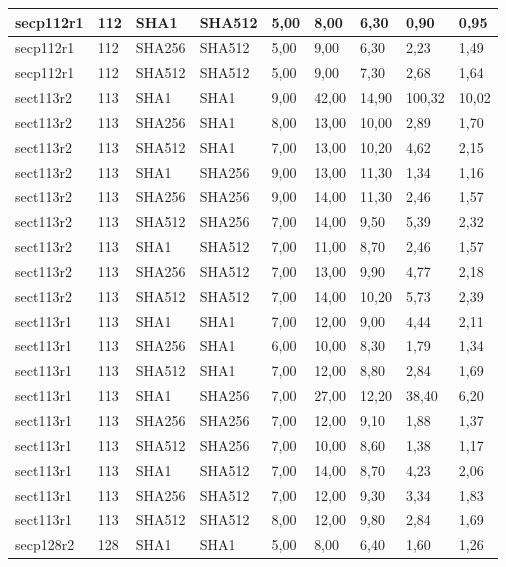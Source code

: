 \begin{longtable}{| l | l | l | l | l |l |l |l |l |}
secp112r1 & 112 & SHA1 & SHA512 & 5,00 & 8,00 & 6,30 & 0,90 & 0,95 \\ \hline 
secp112r1 & 112 & SHA256 & SHA512 & 5,00 & 9,00 & 6,30 & 2,23 & 1,49 \\ \hline 
secp112r1 & 112 & SHA512 & SHA512 & 5,00 & 9,00 & 7,30 & 2,68 & 1,64 \\ \hline 
sect113r2 & 113 & SHA1 & SHA1 & 9,00 & 42,00 & 14,90 & 100,32 & 10,02 \\ \hline 
sect113r2 & 113 & SHA256 & SHA1 & 8,00 & 13,00 & 10,00 & 2,89 & 1,70 \\ \hline 
sect113r2 & 113 & SHA512 & SHA1 & 7,00 & 13,00 & 10,20 & 4,62 & 2,15 \\ \hline 
sect113r2 & 113 & SHA1 & SHA256 & 9,00 & 13,00 & 11,30 & 1,34 & 1,16 \\ \hline 
sect113r2 & 113 & SHA256 & SHA256 & 9,00 & 14,00 & 11,30 & 2,46 & 1,57 \\ \hline 
sect113r2 & 113 & SHA512 & SHA256 & 7,00 & 14,00 & 9,50 & 5,39 & 2,32 \\ \hline 
sect113r2 & 113 & SHA1 & SHA512 & 7,00 & 11,00 & 8,70 & 2,46 & 1,57 \\ \hline 
sect113r2 & 113 & SHA256 & SHA512 & 7,00 & 13,00 & 9,90 & 4,77 & 2,18 \\ \hline 
sect113r2 & 113 & SHA512 & SHA512 & 7,00 & 14,00 & 10,20 & 5,73 & 2,39 \\ \hline 
sect113r1 & 113 & SHA1 & SHA1 & 7,00 & 12,00 & 9,00 & 4,44 & 2,11 \\ \hline 
sect113r1 & 113 & SHA256 & SHA1 & 6,00 & 10,00 & 8,30 & 1,79 & 1,34 \\ \hline 
sect113r1 & 113 & SHA512 & SHA1 & 7,00 & 12,00 & 8,80 & 2,84 & 1,69 \\ \hline 
sect113r1 & 113 & SHA1 & SHA256 & 7,00 & 27,00 & 12,20 & 38,40 & 6,20 \\ \hline 
sect113r1 & 113 & SHA256 & SHA256 & 7,00 & 12,00 & 9,10 & 1,88 & 1,37 \\ \hline 
sect113r1 & 113 & SHA512 & SHA256 & 7,00 & 10,00 & 8,60 & 1,38 & 1,17 \\ \hline 
sect113r1 & 113 & SHA1 & SHA512 & 7,00 & 14,00 & 8,70 & 4,23 & 2,06 \\ \hline 
sect113r1 & 113 & SHA256 & SHA512 & 7,00 & 12,00 & 9,30 & 3,34 & 1,83 \\ \hline 
sect113r1 & 113 & SHA512 & SHA512 & 8,00 & 12,00 & 9,80 & 2,84 & 1,69 \\ \hline 
secp128r2 & 128 & SHA1 & SHA1 & 5,00 & 8,00 & 6,40 & 1,60 & 1,26 \\ \hline 

\end{longtable}
